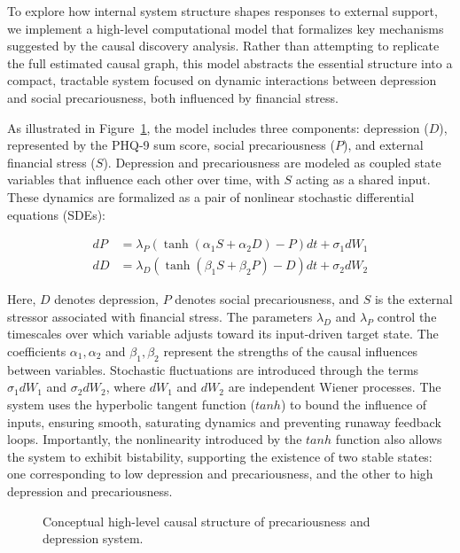 \documentclass[
]{article}
\begin{document}
To explore how internal system structure shapes responses to external
support, we implement a high-level computational model that formalizes
key mechanisms suggested by the causal discovery analysis. Rather than
attempting to replicate the full estimated causal graph, this model
abstracts the essential structure into a compact, tractable system
focused on dynamic interactions between depression and social
precariousness, both influenced by financial stress.

As illustrated in Figure~\ref{fig-concept}, the model includes three
components: depression (\(D\)), represented by the PHQ-9 sum score,
social precariousness (\(P\)), and external financial stress (\(S\)).
Depression and precariousness are modeled as coupled state variables
that influence each other over time, with \(S\) acting as a shared
input. These dynamics are formalized as a pair of nonlinear stochastic
differential equations (SDEs):

\[
\begin{aligned}
dP &= \lambda_P \left( \tanh(\alpha_1 S + \alpha_2 D) - P \right) dt + \sigma_1 dW_1 \\
dD &= \lambda_D \left( \tanh(\beta_1 S + \beta_2 P) - D \right) dt + \sigma_2 dW_2 
\end{aligned}
\]

Here, \(D\) denotes depression, \(P\) denotes social precariousness, and
\(S\) is the external stressor associated with financial stress. The
parameters \(\lambda_D\) and \(\lambda_P\) control the timescales over
which variable adjusts toward its input-driven target state. The
coefficients \(\alpha_1, \alpha_2\) and \(\beta_1, \beta_2\) represent
the strengths of the causal influences between variables. Stochastic
fluctuations are introduced through the terms \(\sigma_1 dW_1\) and
\(\sigma_2 dW_2\), where \(dW_1\) and \(dW_2\) are independent Wiener
processes. The system uses the hyperbolic tangent function (\(tanh\)) to
bound the influence of inputs, ensuring smooth, saturating dynamics and
preventing runaway feedback loops. Importantly, the nonlinearity
introduced by the \(tanh\) function also allows the system to exhibit
bistability, supporting the existence of two stable states: one
corresponding to low depression and precariousness, and the other to
high depression and precariousness.

\begin{figure}


\caption{\label{fig-concept}Conceptual high-level causal structure of
precariousness and depression system.}

\end{figure}%
\end{document}
